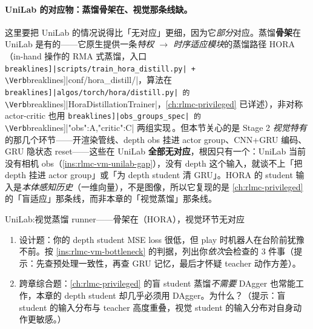 \paragraph{UniLab 的对应物：蒸馏骨架在、视觉那条线缺。}这里要把 UniLab 的情况说得比「无对应」更细，因为它\emph{部分}对应。蒸馏\textbf{骨架}在 UniLab 是有的——它原生提供一条\emph{特权 $\to$ 时序适应模块}的蒸馏路径 HORA（in-hand 操作的 RMA 式蒸馏，入口 \Verb[breaklines]|scripts/train_hora_distill.py| + \Verb[breaklines]|conf/hora_distill/|，算法在 \Verb[breaklines]|algos/torch/hora/distill.py| 的 \Verb[breaklines]|HoraDistillationTrainer|，\cref{ch:rlmc-privileged} 已详述），非对称 actor-critic 也用 \Verb[breaklines]|obs_groups_spec| 的 \Verb[breaklines]|{"obs":A,"critic":C}| 两组实现\,\cite{unilab2026}。但本节关心的是 Stage 2 \emph{视觉特有}的那几个环节——开渲染管线、depth obs 挂进 actor group、CNN+GRU 编码、GRU 隐状态 reset——这些在 UniLab \textbf{全部无对应}，根因只有一个：UniLab 当前没有相机 obs（\cref{ins:rlmc-vm-unilab-gap}），没有 depth 这个输入，就谈不上「把 depth 挂进 actor group」或「为 depth student 清 GRU」。HORA 的 student 输入是\emph{本体感知历史}（一维向量），不是图像，所以它复现的是 \cref{ch:rlmc-privileged} 的「盲适应」那条线，而非本章的「视觉蒸馏」那条线。

\begin{codebox}[text]{UniLab:视觉蒸馏 runner——骨架在（HORA），视觉环节无对应}
\end{codebox}

\begin{practice}[视觉蒸馏的诊断思维]
\begin{enumerate}
\item 设计题：你的 depth student MSE loss 很低，但 play 时机器人在台阶前犹豫不前。按 \cref{ins:rlmc-vm-bottleneck} 的判据，列出你\emph{依次}会检查的 3 件事（提示：先查预处理一致性，再查 GRU 记忆，最后才怀疑 teacher 动作方差）。
\item 跨章综合题：\cref{ch:rlmc-privileged} 的盲 student 蒸馏\emph{不需要} DAgger 也常能工作，本章的 depth student 却几乎必须用 DAgger。为什么？（提示：盲 student 的输入分布与 teacher 高度重叠，视觉 student 的输入分布对自身动作更敏感。）
\end{enumerate}
\end{practice}

